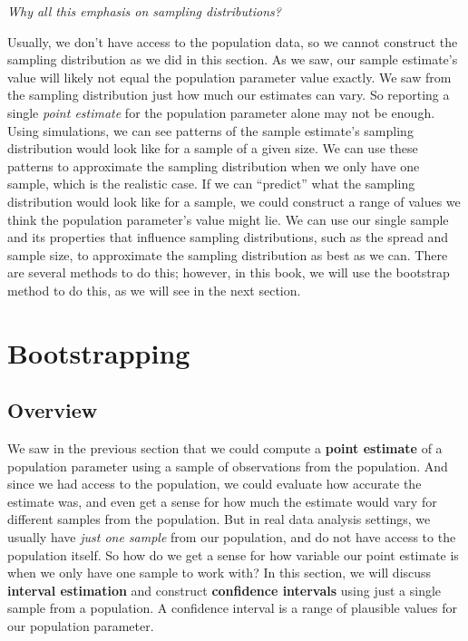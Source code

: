 \documentclass[
]{krantz}
\begin{document}
\emph{Why all this emphasis on sampling distributions?}

Usually, we don't have access to the population data, so we cannot construct the sampling distribution as we did in this section. As we saw, our sample estimate's value will likely not equal the population parameter value exactly. We saw from the sampling distribution just how much our estimates can vary. So reporting a single \emph{point estimate} for the population parameter alone may not be enough. Using simulations, we can see patterns of the sample estimate's sampling distribution would look like for a sample of a given size. We can use these patterns to approximate the sampling distribution when we only have one sample, which is the realistic case. If we can ``predict'' what the sampling distribution would look like for a sample, we could construct a range of values we think the population parameter's value might lie. We can use our single sample and its properties that influence sampling distributions, such as the spread and sample size, to approximate the sampling distribution as best as we can. There are several methods to do this; however, in this book, we will use the bootstrap method to do this, as we will see in the next section.

\hypertarget{bootstrapping}{%
\section{Bootstrapping}\label{bootstrapping}}

\hypertarget{overview-9}{%
\subsection{Overview}\label{overview-9}}

We saw in the previous section that we could compute a \textbf{point estimate} of a population
parameter using a sample of observations from the population. And since we had access to the
population, we could evaluate how accurate the estimate was, and even get a sense for how much
the estimate would vary for different samples from the population.
But in real data analysis settings, we usually have \emph{just one sample} from our population,
and do not have access to the population itself. So how do we get a sense for how
variable our point estimate is when we only have one sample to work with?
In this section, we will discuss \textbf{interval estimation} and construct \textbf{confidence intervals} using just a single sample from a population. A confidence interval is a range of plausible values for our population parameter.
\end{document}

